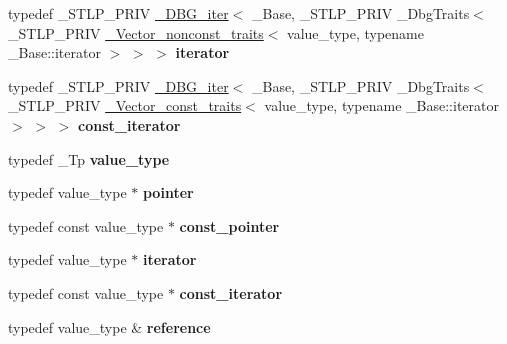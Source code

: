 \begin{DoxyCompactItemize}
\item 
\mbox{\label{structvector_a438916155a9929cc739b81a0224fa401}} 
typedef \+\_\+\+S\+T\+L\+P\+\_\+\+P\+R\+IV \hyperlink{struct___d_b_g__iter}{\+\_\+\+D\+B\+G\+\_\+iter}$<$ \+\_\+\+Base, \+\_\+\+S\+T\+L\+P\+\_\+\+P\+R\+IV \+\_\+\+Dbg\+Traits$<$ \+\_\+\+S\+T\+L\+P\+\_\+\+P\+R\+IV \hyperlink{struct___vector__nonconst__traits}{\+\_\+\+Vector\+\_\+nonconst\+\_\+traits}$<$ value\+\_\+type, typename \+\_\+\+Base\+::iterator $>$ $>$ $>$ {\bfseries iterator}
\item 
\mbox{\label{structvector_a9bd2133cb02cc4516558d0d69a24a953}} 
typedef \+\_\+\+S\+T\+L\+P\+\_\+\+P\+R\+IV \hyperlink{struct___d_b_g__iter}{\+\_\+\+D\+B\+G\+\_\+iter}$<$ \+\_\+\+Base, \+\_\+\+S\+T\+L\+P\+\_\+\+P\+R\+IV \+\_\+\+Dbg\+Traits$<$ \+\_\+\+S\+T\+L\+P\+\_\+\+P\+R\+IV \hyperlink{struct___vector__const__traits}{\+\_\+\+Vector\+\_\+const\+\_\+traits}$<$ value\+\_\+type, typename \+\_\+\+Base\+::iterator $>$ $>$ $>$ {\bfseries const\+\_\+iterator}
\item 
\mbox{\label{structvector_a417488eed04ba6af23ec468e1d9d5609}} 
typedef \+\_\+\+Tp {\bfseries value\+\_\+type}
\item 
\mbox{\label{structvector_a5dc97c6e95109f0581268d280027e41b}} 
typedef value\+\_\+type $\ast$ {\bfseries pointer}
\item 
\mbox{\label{structvector_a23f8116002867a7eabfc9573ed8c600e}} 
typedef const value\+\_\+type $\ast$ {\bfseries const\+\_\+pointer}
\item 
\mbox{\label{structvector_abc2b132f6454a403ddd36c9c200b9e32}} 
typedef value\+\_\+type $\ast$ {\bfseries iterator}
\item 
\mbox{\label{structvector_a99c62d82e7555cf609670fef6d9f2e79}} 
typedef const value\+\_\+type $\ast$ {\bfseries const\+\_\+iterator}
\item 
\mbox{\label{structvector_ac108bda5785f91507eedfd55be84ed08}} 
typedef value\+\_\+type \& {\bfseries reference}
\item 
\mbox{\label{structvector_adb132ca32e178b5b8ec36e5053365c98}} 

\end{DoxyCompactItemize}
